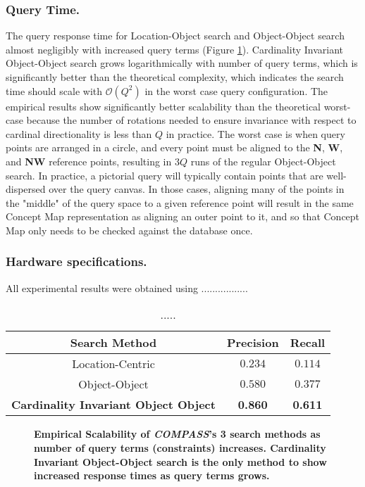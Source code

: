 \subsubsection{Query Time.}
The query response time for Location-Object search and Object-Object search almost negligibly with increased query terms (Figure \ref{figure:query-time}).
Cardinality Invariant Object-Object search grows logarithmically with number of query terms, which is significantly better than the theoretical complexity, which indicates the search time should scale with $\mathcal{O}(Q^2)$ in the worst case query configuration.
The empirical results show significantly better scalability than the theoretical worst-case because the number of rotations needed to ensure invariance with respect to cardinal directionality is less than $Q$ in practice. 
The worst case is when query points are arranged in a circle, and every point must be aligned to the \textbf{N}, \textbf{W}, and \textbf{NW} reference points, resulting in $3Q$ runs of the regular Object-Object search.
In practice, a pictorial query will typically contain points that are well-dispersed over the query canvas.
In those cases, aligning many of the points in the "middle" of the query space to a given reference point will result in the same Concept Map representation as aligning an outer point to it, and so that Concept Map only needs to be checked against the database once.


\subsubsection{Hardware specifications.} 
All experimental results were obtained using .................

\small{
\begin{table}[h]
    \begin{center}
        \begin{tabular}{ |c|c|c| } 
            \hline
            Search Method & Precision & Recall\\
            \hline
            Location-Centric & $0.234$ & $0.114$ \\ 
            Object-Object & $0.580$ & $0.377$ \\  
            \textbf{Cardinality Invariant Object Object} & \textbf{0.860} & \textbf{0.611} \\ 
            \hline     
        \end{tabular}
        \caption{.....} 
        \label{Table:PerformanceResults}
    \end{center}
\end{table}
}

\begin{figure}[h]
    \centering
        
    \caption{\textbf{Empirical Scalability of \emph{COMPASS}'s 3 search methods as number of query terms (constraints) increases. Cardinality Invariant Object-Object search is the only method to show increased response times as query terms grows.}}\label{figure:query-time} 
\end{figure}
